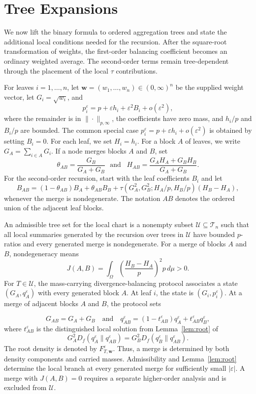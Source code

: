 \documentclass[11pt]{article}
\theoremstyle{plain}
\theoremstyle{definition}
\theoremstyle{definition}
\newcommand{\BT}{\mathcal T}
\newcommand{\eps}{\varepsilon}
\newcommand{\wv}{\mathbf w}
\newcommand{\Fw}[1]{F_{#1,\wv}^{\eps}}
\begin{document}
\section{Tree Expansions}\label{sec:trees}

We now lift the binary formula to ordered aggregation trees and state the additional local conditions needed for the recursion. After the square-root transformation of weights, the first-order balancing coefficient becomes an ordinary weighted average. The second-order terms remain tree-dependent through the placement of the local $\tau$ contributions.

For leaves $i=1,\ldots,n$, let $\wv=(w_1,\ldots,w_n)\in(0,\infty)^n$ be the supplied weight vector, let $G_i=\sqrt{w_i}$, and
\[
p_i^\eps=p+\eps h_i+\eps^2B_i+o(\eps^2),
\]
where the remainder is in $\|\cdot\|_{p,\infty}$, the coefficients have zero mass, and $h_i/p$ and $B_i/p$ are bounded. The common special case $p_i^\eps=p+\eps h_i+o(\eps^2)$ is obtained by setting $B_i=0$. For each leaf, we set
$H_i=h_i$. For a block $A$ of leaves, we write $G_A=\sum_{i\in A}G_i$. If a node merges blocks $A$ and $B$, set
\[
\theta_{AB}=\frac{G_B}{G_A+G_B}
\,\,\,\,\text{and}\,\,\,\,\,
H_{AB}=\frac{G_AH_A+G_BH_B}{G_A+G_B}.
\]
For the second-order recursion, start with the leaf coefficients $B_i$ and let
\[
B_{AB}=(1-\theta_{AB})B_A+\theta_{AB}B_B+\tau(G_A^2,G_B^2;H_A/p,H_B/p)(H_B-H_A),
\]
whenever the merge is nondegenerate. The notation $AB$ denotes the ordered union of the adjacent leaf blocks.

An admissible tree set for the local chart is a nonempty subset $\mathcal U\subseteq\BT_n$ such that all local summaries generated by the recursion over trees in $\mathcal U$ have bounded $p$-ratios and every generated merge is nondegenerate. For a merge of blocks $A$ and $B$, nondegeneracy means
\[
J(A,B)=\int_\Omega\left(\frac{H_B-H_A}{p}\right)^2p\,d\mu>0.
\]
For $T\in\mathcal U$, the mass-carrying divergence-balancing protocol associates a state $(G_A,q_A^\eps)$ with every generated block $A$. At leaf $i$, the state is $(G_i,p_i^\eps)$. At a merge of adjacent blocks $A$ and $B$, the protocol sets

\[
G_{AB}=G_A+G_B
\quad\text{and}\quad
q_{AB}^\eps=(1-t_{AB}^\eps)q_A^\eps+t_{AB}^\eps q_B^\eps,
\]
where $t_{AB}^\eps$ is the distinguished local solution from Lemma~\ref{lem:root} of
\[
G_A^2D_f(q_A^\eps\|q_{AB}^\eps)
=G_B^2D_f(q_B^\eps\|q_{AB}^\eps).
\]
The root density is denoted by $\Fw{T}$. Thus, a merge is determined by both density components and carried masses. Admissibility and Lemma~\ref{lem:root} determine the local branch at every generated merge for sufficiently small $|\eps|$. A merge with $J(A,B)=0$ requires a separate higher-order analysis and is excluded from $\mathcal U$.
\end{document}

